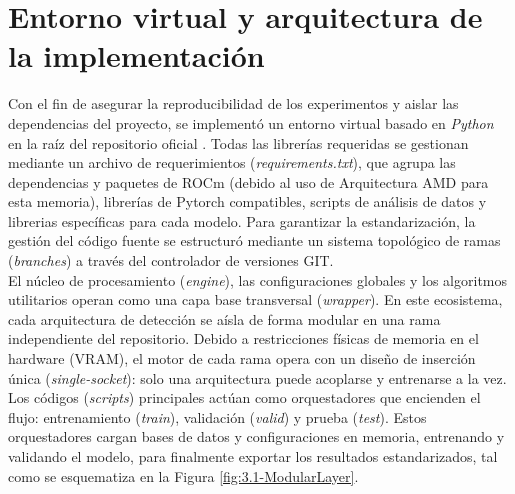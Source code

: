 

\section{Entorno virtual y arquitectura de la implementación}

Con el fin de asegurar la reproducibilidad de los experimentos y aislar las dependencias del proyecto, se implementó un entorno virtual basado en \textit{Python} en la raíz del repositorio oficial \cite{repo_fernando2024}. Todas las librerías requeridas se gestionan mediante un archivo de requerimientos (\textit{requirements.txt}), que agrupa las dependencias y paquetes de ROCm (debido al uso de Arquitectura AMD para esta memoria), librerías de Pytorch compatibles, scripts de análisis de datos y librerias específicas para cada modelo. Para garantizar la estandarización, la gestión del código fuente se estructuró mediante un sistema topológico de ramas (\textit{branches}) a través del controlador de versiones GIT. \\

El núcleo de procesamiento (\textit{engine}), las configuraciones globales y los algoritmos utilitarios operan como una capa base transversal (\textit{wrapper}). En este ecosistema, cada arquitectura de detección se aísla de forma modular en una rama independiente del repositorio. Debido a restricciones físicas de memoria en el hardware (VRAM), el motor de cada rama opera con un diseño de inserción única (\textit{single-socket}): solo una arquitectura puede acoplarse y entrenarse a la vez. Los códigos (\textit{scripts}) principales actúan como orquestadores que encienden el flujo: entrenamiento (\textit{train}), validación (\textit{valid}) y prueba (\textit{test}). Estos orquestadores cargan bases de datos y configuraciones en memoria, entrenando y validando el modelo, para finalmente exportar los resultados estandarizados, tal como se esquematiza en la Figura \ref{fig:3.1-ModularLayer}.

